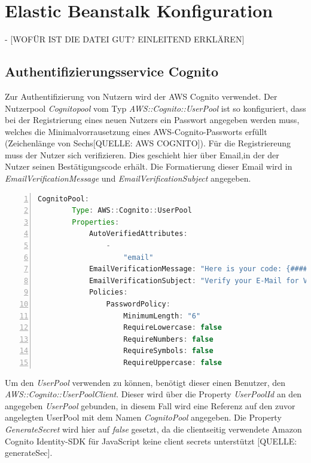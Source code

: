 \documentclass[a4paper, 12pt]{scrreprt}
\begin{document}
\section{Elastic Beanstalk Konfiguration}
- [WOFÜR IST DIE DATEI GUT? EINLEITEND ERKLÄREN]



\subsection{Authentifizierungsservice Cognito}
Zur Authentifizierung von Nutzern wird der AWS Cognito verwendet. Der Nutzerpool \textit{Cognitopool} vom Typ \textit{AWS::Cognito::UserPool} ist so konfiguriert, dass bei der Registrierung eines neuen Nutzers ein Passwort angegeben werden muss, welches die Minimalvorrausetzung eines AWS-Cognito-Passworts erfüllt (Zeichenlänge von Sechs[QUELLE: AWS COGNITO]). Für die Registriereung muss der Nutzer sich verifizieren. Dies geschieht hier über Email,in der der Nutzer seinen Bestätigungscode erhält. Die Formatierung dieser Email wird in \textit{EmailVerificationMessage} und \textit{EmailVerificationSubject} angegeben.  
\begin{lstlisting}[xleftmargin=\parindent,numbers=left,numberstyle=\small,numbersep=8pt,frame=L,mathescape=true, basicstyle=\small, language=Java, lineskip={1.0pt}]
CognitoPool:
        Type: AWS::Cognito::UserPool
        Properties:
            AutoVerifiedAttributes:
                -
                    "email"
            EmailVerificationMessage: "Here is your code: {####}"
            EmailVerificationSubject: "Verify your E-Mail for VD"
            Policies:
                PasswordPolicy:
                    MinimumLength: "6"
                    RequireLowercase: false
                    RequireNumbers: false
                    RequireSymbols: false
                    RequireUppercase: false

\end{lstlisting}
\bigskip
\noindent Um den \textit{UserPool} verwenden zu können, benötigt dieser einen Benutzer, den \textit{AWS::Cognito::UserPoolClient}. Dieser wird über die Property \textit{UserPoolId} an den angegeben \textit{UserPool} gebunden, in diesem Fall wird eine Referenz auf den zuvor angelegten UserPool mit dem Namen \textit{CognitoPool} angegeben. Die Property \textit{GenerateSecret} wird hier auf \textit{false} gesetzt, da die clientseitig verwendete Amazon Cognito Identity-SDK für JavaScript keine client secrets unterstützt [QUELLE: generateSec].
\end{document}

